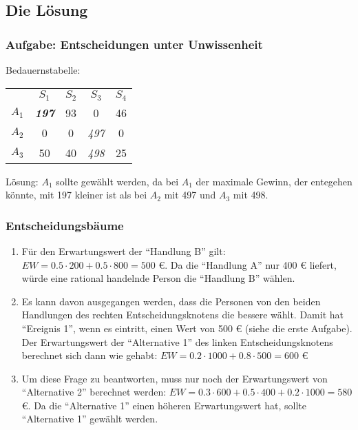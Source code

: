 \subsection{Die Lösung}

\subsubsection*{Aufgabe: Entscheidungen unter Unwissenheit}

Bedauernstabelle:

\begin{center}
\begin{tabular}{c|c|c|c|c|}
\multicolumn{1}{c}{} & \multicolumn{1}{c}{$S_1$}
& \multicolumn{1}{c}{$S_2$} & \multicolumn{1}{c}{$S_3$}
& \multicolumn{1}{c}{$S_4$}
\\ \cline{2-5}
$A_1$ & {\bf {\em 197}} &   93 &          0 & 46 \\ \cline{2-5} 
$A_2$ &   0             &    0 &  {\em 497} &  0 \\ \cline{2-5}
$A_3$ &  50             &   40 &  {\em 498} & 25 \\ \cline{2-5}
\end{tabular}
\end{center}

Lösung: {\bf $A_1$} sollte gewählt werden, da bei $A_1$ der maximale
Gewinn, der entegehen könnte, mit 197 kleiner ist als bei $A_2$ mit
497 und $A_3$ mit 498.


\subsubsection*{Entscheidungsbäume}

\begin{enumerate}
\item Für den Erwartungswert der "`Handlung B"' gilt: $EW = 0.5 \cdot
  200 + 0.5 \cdot 800 = 500$ €.  Da die "`Handlung A"' nur 400 €
  liefert, würde eine rational handelnde Person die "`Handlung B"'
  wählen.

\item Es kann davon ausgegangen werden, dass die Personen von den
  beiden Handlungen des rechten Entscheidungsknotens die bessere
  wählt. Damit hat "`Ereignis 1"', wenn es eintritt, einen Wert von
  500 € (siehe die erste Aufgabe). Der Erwartungswert der
  "`Alternative 1"' des linken Entscheidungsknotens berechnet sich
  dann wie gehabt: $EW = 0.2 \cdot 1000 + 0.8 \cdot 500 = 600$ €

\item Um diese Frage zu beantworten, muss nur noch der Erwartungswert
  von "`Alternative 2"' berechnet werden: $EW = 0.3 \cdot 600 + 0.5
  \cdot 400 + 0.2 \cdot 1000 = 580$ €. Da die "`Alternative 1"' einen
  höheren Erwartungswert hat, sollte "`Alternative 1"' gewählt werden.
\end{enumerate}



